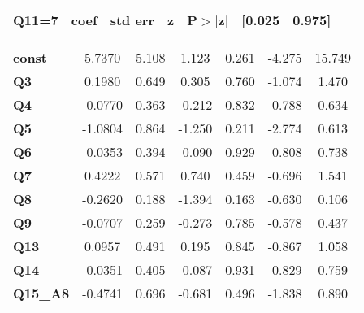 \begin{center}
\begin{tabular}{lcccccc}
\bottomrule
\end{tabular}
\begin{tabular}{ccccccc}
 \textbf{Q11=7}  & \textbf{coef} & \textbf{std err} & \textbf{z} & \textbf{P$> |$z$|$} & \textbf{[0.025} & \textbf{0.975]}  \\
\midrule
\bottomrule
\end{tabular}
\begin{tabular}{lcccccc}
\textbf{const}   &       5.7370  &        5.108     &     1.123  &         0.261        &       -4.275    &       15.749     \\
\textbf{Q3}      &       0.1980  &        0.649     &     0.305  &         0.760        &       -1.074    &        1.470     \\
\textbf{Q4}      &      -0.0770  &        0.363     &    -0.212  &         0.832        &       -0.788    &        0.634     \\
\textbf{Q5}      &      -1.0804  &        0.864     &    -1.250  &         0.211        &       -2.774    &        0.613     \\
\textbf{Q6}      &      -0.0353  &        0.394     &    -0.090  &         0.929        &       -0.808    &        0.738     \\
\textbf{Q7}      &       0.4222  &        0.571     &     0.740  &         0.459        &       -0.696    &        1.541     \\
\textbf{Q8}      &      -0.2620  &        0.188     &    -1.394  &         0.163        &       -0.630    &        0.106     \\
\textbf{Q9}      &      -0.0707  &        0.259     &    -0.273  &         0.785        &       -0.578    &        0.437     \\
\textbf{Q13}     &       0.0957  &        0.491     &     0.195  &         0.845        &       -0.867    &        1.058     \\
\textbf{Q14}     &      -0.0351  &        0.405     &    -0.087  &         0.931        &       -0.829    &        0.759     \\
\textbf{Q15\_A8} &      -0.4741  &        0.696     &    -0.681  &         0.496        &       -1.838    &        0.890     \\
\bottomrule
\end{tabular}
\end{center}
\newpage
